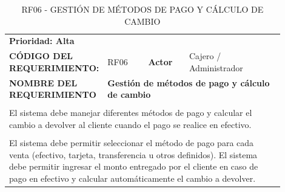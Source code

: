 \begingroup
\renewcommand{\arraystretch}{1.3}
\setlength{\tabcolsep}{6pt}
\centering
\begin{longtable}{|p{0.25\linewidth}|p{0.15\linewidth}|p{0.15\linewidth}|p{0.35\linewidth}|}
\caption{RF06 - GESTIÓN DE MÉTODOS DE PAGO Y CÁLCULO DE CAMBIO}\label{tab:rf06}\\
\hline
		\rowcolor{tableheaderblue}
		\multicolumn{4}{|l|}{\textbf{Requerimientos funcionales}}                                                                                                                                                       \\ \hline
		\multicolumn{4}{|l|}{\textbf{Prioridad: Alta}}                                                                                                                                                                  \\ \hline
		\textbf{CÓDIGO DEL REQUERIMIENTO:}                          & RF06                                                                         & \cellcolor{tableheaderblue}\textbf{Actor} & Cajero / Administrador \\ \hline
		\textbf{NOMBRE DEL REQUERIMIENTO}                           & \multicolumn{3}{l|}{\textbf{Gestión de métodos de pago y cálculo de cambio}}                                                                      \\ \hline
		\rowcolor{tableheaderblue}
		\multicolumn{4}{|l|}{\textbf{Descripción}}                                                                                                                                                                      \\ \hline
		\multicolumn{4}{|p{0.96\linewidth}|}{%
		El sistema debe manejar diferentes métodos de pago y calcular el cambio a devolver al cliente cuando el pago se realice en efectivo.}                                                                           \\ \hline
		\rowcolor{tableheaderblue}
		\multicolumn{4}{|l|}{\textbf{Funcionalidad}}                                                                                                                                                                    \\ \hline
		\multicolumn{4}{|p{0.96\linewidth}|}{%
		El sistema debe permitir seleccionar el método de pago para cada venta (efectivo, tarjeta, transferencia u otros definidos). \newline
		El sistema debe permitir ingresar el monto entregado por el cliente en caso de pago en efectivo y calcular automáticamente el cambio a devolver. \newline
}
\end{longtable}
